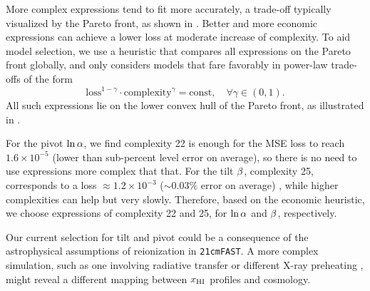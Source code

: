 More complex expressions tend to fit more accurately, a trade-off
typically visualized by the Pareto front, as shown in .
Better and more economic expressions can achieve a lower loss at
moderate increase of complexity.
To aid model selection, we use a heuristic that compares all expressions
on the Pareto front globally, and only considers models that fare
favorably in power-law trade-offs of the form
%
\begin{equation}
\mathrm{loss}^{1 - \gamma} \cdot \mathrm{complexity}^\gamma
= \mathrm{const}, \quad \forall \gamma \in (0, 1).
\end{equation}
All such expressions lie on the lower convex hull of the Pareto front,
as illustrated in .

For the pivot $\ln\alpha$, we find complexity 22 is enough for the MSE loss
to reach $1.6 \times 10^{-5}$ (lower than sub-percent level error on average), 
so there is no need to use expressions more complex that that.
For the tilt $\beta$, complexity 25, corresponds to a loss $\approx 1.2\times10^{-3}$
($\sim 0.03\%$ error on average) , while higher complexities
can help but very slowly.
Therefore, based on the economic heuristic, we choose expressions of
complexity 22 and 25, for $\ln\alpha$ and $\beta$, respectively.

Our current selection for tilt and pivot could be a consequence of the
astrophysical assumptions of reionization in \texttt{21cmFAST}.
A more complex simulation, such as one involving radiative transfer or
different X-ray preheating \cite{Montero2024}, might reveal a different 
mapping between $x_{\mathrm{HI}}$ profiles and cosmology.

